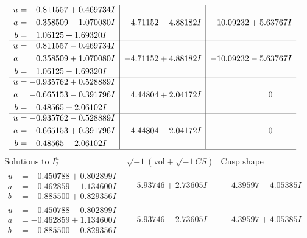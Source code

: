 \documentclass[1p]{elsarticle_modified}
\theoremstyle{definition}
\newcommand{\I}{\sqrt{-1}}
\begin{document}
$$\begin{array}{c|c|c}
\begin{aligned}
u &= \phantom{-}0.811557 + 0.469734 I \\
a &= \phantom{-}0.358509 - 1.070080 I \\
b &= \phantom{-}1.06125 + 1.69320 I\end{aligned}
 & -4.71152 - 4.88182 I & -10.09232 + 5.63767 I \\ \hline\begin{aligned}
u &= \phantom{-}0.811557 - 0.469734 I \\
a &= \phantom{-}0.358509 + 1.070080 I \\
b &= \phantom{-}1.06125 - 1.69320 I\end{aligned}
 & -4.71152 + 4.88182 I & -10.09232 - 5.63767 I \\ \hline\begin{aligned}
u &= -0.935762 + 0.528889 I \\
a &= -0.665153 - 0.391796 I \\
b &= \phantom{-}0.48565 + 2.06102 I\end{aligned}
 & \phantom{-}4.44804 + 2.04172 I & \phantom{-0.000000 } 0 \\ \hline\begin{aligned}
u &= -0.935762 - 0.528889 I \\
a &= -0.665153 + 0.391796 I \\
b &= \phantom{-}0.48565 - 2.06102 I\end{aligned}
 & \phantom{-}4.44804 - 2.04172 I & \phantom{-0.000000 } 0\\
 \hline 
 \end{array}$$\newpage$$\begin{array}{c|c|c}  
\text{Solutions to }I^u_{2}& \I (\text{vol} + \sqrt{-1}CS) & \text{Cusp shape}\\
 \hline 
\begin{aligned}
u &= -0.450788 + 0.802899 I \\
a &= -0.462859 - 1.134600 I \\
b &= -0.885500 + 0.829356 I\end{aligned}
 & \phantom{-}5.93746 + 2.73605 I & \phantom{-}4.39597 - 4.05385 I \\ \hline\begin{aligned}
u &= -0.450788 - 0.802899 I \\
a &= -0.462859 + 1.134600 I \\
b &= -0.885500 - 0.829356 I\end{aligned}
 & \phantom{-}5.93746 - 2.73605 I & \phantom{-}4.39597 + 4.05385 I \\ \hline\begin{aligned}

\end{aligned}
\end{array}$$
\end{document}
